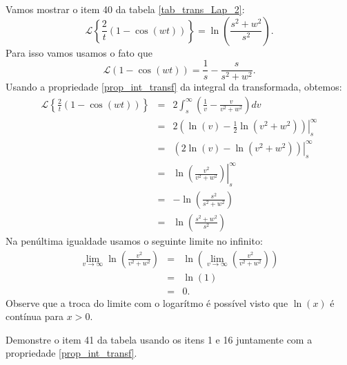 \begin{ex}Vamos mostrar o item 40 da tabela \ref{tab_trans_Lap_2}:
$$
\mathcal{L}\left\{\frac{2}{t}\left(1-\cos(wt)\right)\right\}=\ln\left(\frac{s^2+w^2}{s^2}\right).
$$
Para isso vamos usamos o fato que
\begin{equation*}
\mathcal{L}\left(1-\cos(wt)\right)=\frac{1}{s}-\frac{s}{s^2+w^2}.
\end{equation*}
Usando a propriedade \ref{prop_int_transf} da integral da transformada, obtemos:
\begin{eqnarray*}
\mathcal{L}\left\{\frac{2}{t}\left(1-\cos(wt)\right)\right\}&=&2\int_s^\infty \left(\frac{1}{v}-\frac{v}{v^2+w^2}\right)dv\\
&=& \left.2\left(\ln(v)-\frac{1}{2}\ln(v^2+w^2)\right)\right|_s^\infty\\
&=& \left.\left(2\ln(v)-\ln(v^2+w^2)\right)\right|_s^\infty\\
&=&\left.\ln\left(\frac{v^2}{v^2+w^2}\right)\right|_s^\infty\\
&=&-\ln\left(\frac{s^2}{s^2+w^2}\right)\\
&=&\ln\left(\frac{s^2+w^2}{s^2}\right)
\end{eqnarray*}
Na penúltima igualdade usamos o seguinte limite no infinito:
\begin{eqnarray*}
\lim_{v\to\infty} \ln\left(\frac{v^2}{v^2+w^2}\right)&=& \ln\left(\lim_{v\to\infty}\left(\frac{v^2}{v^2+w^2}\right)\right)\\
&=& \ln\left(1\right)\\
&=&0.
\end{eqnarray*}
Observe que a troca do limite com o logarítmo é possível visto que $\ln(x)$ é contínua para $x>0$.
\end{ex}
\begin{prob}Demonstre o item 41 da tabela usando os itens 1 e 16 juntamente com a propriedade \ref{prop_int_transf}.
\end{prob}

